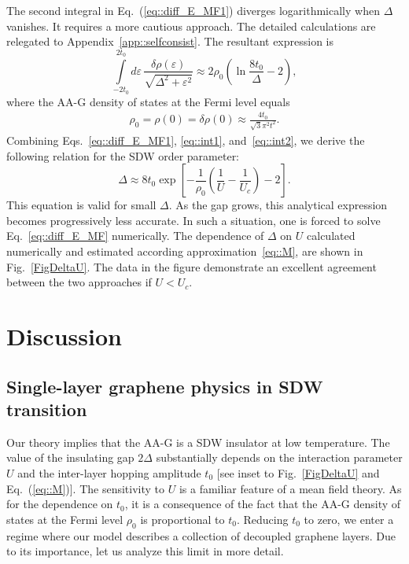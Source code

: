 \documentclass[prb,twocolumn,showpacs,aps,superscriptaddress,floatfix]{revtex4}
\begin{document}
The second integral in
Eq.~(\ref{eq::diff_E_MF1})
diverges logarithmically when $\Delta$ vanishes. It requires a more
cautious approach. The detailed calculations are relegated to
Appendix~\ref{app::selfconsist}.
The resultant expression is
\begin{equation}
\label{eq::int2}
\int\limits_{-2t_0}^{2t_0}\!\!\!d\varepsilon\,
	\frac{\delta\rho(\varepsilon)}{\sqrt{\Delta^2+\varepsilon^2}}
\approx
2\rho_0\left(\ln\frac{8t_0}{\Delta}-2\right),
\end{equation}
where the AA-G density of states at the Fermi level equals
\begin{eqnarray}
\label{eq::rho0}
\rho_0=\rho(0)
=
\delta \rho (0)
\approx
\frac{4t_0}{\sqrt{3}\pi^2 t^2}.
\end{eqnarray}
Combining
Eqs.~\eqref{eq::diff_E_MF1},
\eqref{eq::int1},
and~\eqref{eq::int2},
we derive the following relation for the SDW order parameter:
\begin{equation}\label{eq::M}
\Delta
\approx
8t_0\exp\left[-\frac{1}{\rho_0}\left(\frac{1}{U}-\frac{1}{U_c}\right)-2
       \right].
\end{equation}
This equation is valid for small $\Delta$. As the gap grows, this
analytical expression becomes progressively less accurate. In such a
situation, one is forced to solve
Eq.~\eqref{eq::diff_E_MF}
numerically. The dependence of $\Delta$ on $U$ calculated numerically and
estimated according
approximation~\eqref{eq::M},
are shown in
Fig.~\ref{FigDeltaU}.
The data in the figure demonstrate an excellent agreement between the two
approaches if
$U < U_c$.

\section{Discussion}\label{sec::conclusions}

\subsection{Single-layer graphene physics in SDW transition}

Our theory implies that the AA-G is a SDW insulator at low temperature. The
value of the insulating gap
$2\Delta$
substantially depends on the interaction parameter $U$ and the inter-layer
hopping amplitude
$t_0$
[see inset to
Fig.~\ref{FigDeltaU}
and
Eq.~(\ref{eq::M})].
The sensitivity to $U$ is a familiar feature of a mean field theory. As for
the dependence on 
$t_0$,
it is a consequence of the fact that the AA-G density of states at the
Fermi level
$\rho_0$
is proportional to
$t_0$.
Reducing
$t_0$
to zero, we enter a regime where our model describes a collection of
decoupled graphene layers. Due to its importance, let us analyze this
limit in more detail.
\end{document}
